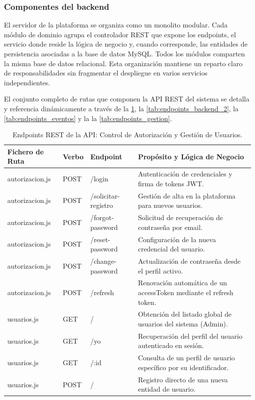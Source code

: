         \subsubsection{Componentes del backend}

        El servidor de la plataforma se organiza como un monolito modular. Cada módulo de dominio agrupa el controlador REST que expone los endpoints, el servicio donde reside la lógica de negocio y, cuando corresponde, las entidades de persistencia asociadas a la base de datos MySQL. Todos los módulos comparten la misma base de datos relacional. Esta organización mantiene un reparto claro de responsabilidades sin fragmentar el despliegue en varios servicios independientes.

        El conjunto completo de rutas que componen la API REST del sistema se detalla y referencia dinámicamente a través de la \ref{tab:endpoints_backend_1}, la \ref{tab:endpoints_backend_2}, la \ref{tab:endpoints_eventos} y la la \ref{tab:endpoints_gestion}.

        \begin{table}[htbp]
        \centering
        \footnotesize
        \renewcommand{\arraystretch}{1.1}
        \begin{tabularx}{\textwidth}{|l|l|l|X|}
        \hline
        \rowcolor[HTML]{EFEFEF} 
        \textbf{Fichero de Ruta} & \textbf{Verbo} & \textbf{Endpoint} & \textbf{Propósito y Lógica de Negocio} \\ \hline
        autorizacion.js & POST & /login & Autenticación de credenciales y firma de tokens JWT. \\ \hline
        autorizacion.js & POST & /solicitar-registro & Gestión de alta en la plataforma para nuevos usuarios. \\ \hline
        autorizacion.js & POST & /forgot-password & Solicitud de recuperación de contraseña por email. \\ \hline
        autorizacion.js & POST & /reset-password & Configuración de la nueva credencial del usuario. \\ \hline
        autorizacion.js & POST & /change-password & Actualización de contraseña desde el perfil activo. \\ \hline
        autorizacion.js & POST & /refresh & Renovación automática de un accessToken mediante el refresh token. \\ \hline
        usuarios.js & GET & / & Obtención del listado global de usuarios del sistema (Admin). \\ \hline
        usuarios.js & GET & /yo & Recuperación del perfil del usuario autenticado en sesión. \\ \hline
        usuarios.js & GET & /:id & Consulta de un perfil de usuario específico por su identificador. \\ \hline
        usuarios.js & POST & / & Registro directo de una nueva entidad de usuario. \\ \hline
        \end{tabularx}
        \caption{Endpoints REST de la API: Control de Autorización y Gestión de Usuarios.}
        \label{tab:endpoints_backend_1}
        \end{table}

